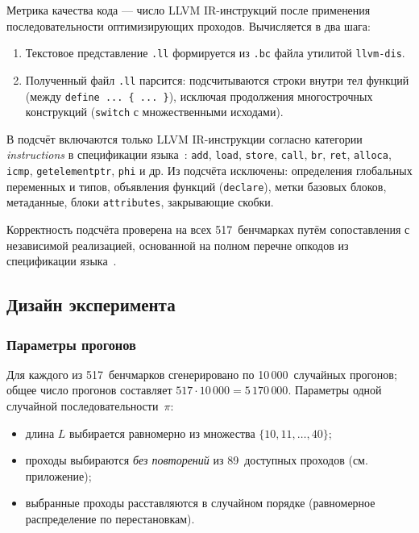 Метрика качества кода --- число LLVM IR-инструкций после применения последовательности оптимизирующих проходов. Вычисляется в два шага:
\begin{enumerate}
    \item Текстовое представление \texttt{.ll} формируется из \texttt{.bc} файла утилитой \texttt{llvm-dis}.
    \item Полученный файл \texttt{.ll} парсится: подсчитываются строки внутри тел функций (между \texttt{define ... \{ ... \}}), исключая продолжения многострочных конструкций (\texttt{switch} с множественными исходами).
\end{enumerate}

В подсчёт включаются только LLVM IR-инструкции согласно категории \emph{instructions} в спецификации языка~\cite{llvm_langref}: \texttt{add}, \texttt{load}, \texttt{store}, \texttt{call}, \texttt{br}, \texttt{ret}, \texttt{alloca}, \texttt{icmp}, \texttt{getelementptr}, \texttt{phi} и др. Из подсчёта исключены: определения глобальных переменных и типов, объявления функций (\texttt{declare}), метки базовых блоков, метаданные, блоки \texttt{attributes}, закрывающие скобки.

Корректность подсчёта проверена на всех 517~бенчмарках путём сопоставления с независимой реализацией, основанной на полном перечне опкодов из спецификации языка~\cite{llvm_langref}.

\subsection{Дизайн эксперимента}

\subsubsection{Параметры прогонов}

Для каждого из 517~бенчмарков сгенерировано по 10\,000~случайных прогонов; общее число прогонов составляет $517 \cdot 10\,000 = 5\,170\,000$. Параметры одной случайной последовательности~$\pi$:
\begin{itemize}
    \item длина $L$ выбирается равномерно из множества $\{10, 11, \dots, 40\}$;
    \item проходы выбираются \emph{без повторений} из 89~доступных проходов (см. приложение);
    \item выбранные проходы расставляются в случайном порядке (равномерное распределение по перестановкам).
\end{itemize}

